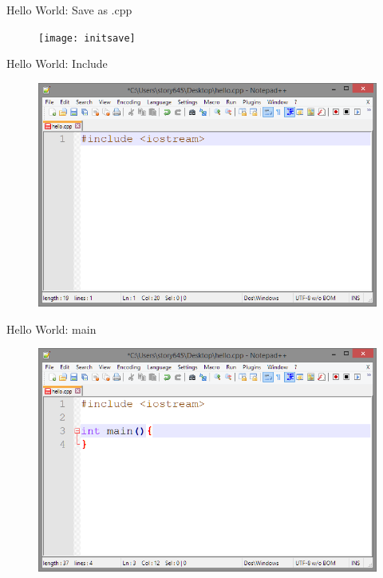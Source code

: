 \documentclass[xcolor={dvipsnames}]{beamer}
\begin{document}
\begin{frame}{Hello World: Save as .cpp}
	\begin{figure}
			\texttt{[image: initsave]}
	\end{figure}
\end{frame}
\begin{frame}{Hello World: Include}
	\begin{figure}
			\includegraphics[width=1\textwidth]{include}
	\end{figure}
\end{frame}


\begin{frame}{Hello World: main}
	\begin{figure}
			\includegraphics[width=1\textwidth]{main}
	\end{figure}
\end{frame}
\end{document}
